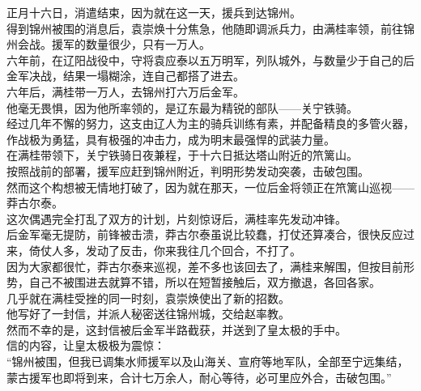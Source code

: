 \begin{multicols}{\theparacolNo}
正月十六日，消遣结束，因为就在这一天，援兵到达锦州。\\

得到锦州被围的消息后，袁崇焕十分焦急，他随即调派兵力，由满桂率领，前往锦州会战。援军的数量很少，只有一万人。\\

六年前，在辽阳战役中，守将袁应泰以五万明军，列队城外，与数量少于自己的后金军决战，结果一塌糊涂，连自己都搭了进去。\\

六年后，满桂带一万人，去锦州打六万后金军。\\

他毫无畏惧，因为他所率领的，是辽东最为精锐的部队——关宁铁骑。\\

经过几年不懈的努力，这支由辽人为主的骑兵训练有素，并配备精良的多管火器，作战极为勇猛，具有极强的冲击力，成为明末最强悍的武装力量。\\

在满桂带领下，关宁铁骑日夜兼程，于十六日抵达塔山附近的笊篱山。\\

按照战前的部署，援军应赶到锦州附近，判明形势发动突袭，击破包围。\\

然而这个构想被无情地打破了，因为就在那天，一位后金将领正在笊篱山巡视——莽古尔泰。\\

这次偶遇完全打乱了双方的计划，片刻惊讶后，满桂率先发动冲锋。\\

后金军毫无提防，前锋被击溃，莽古尔泰虽说比较蠢，打仗还算凑合，很快反应过来，倚仗人多，发动了反击，你来我往几个回合，不打了。\\

因为大家都很忙，莽古尔泰来巡视，差不多也该回去了，满桂来解围，但按目前形势，自己不被围进去就算不错，所以在短暂接触后，双方撤退，各回各家。\\

几乎就在满桂受挫的同一时刻，袁崇焕使出了新的招数。\\

他写好了一封信，并派人秘密送往锦州城，交给赵率教。\\

然而不幸的是，这封信被后金军半路截获，并送到了皇太极的手中。\\

信的内容，让皇太极极为震惊：\\

“锦州被围，但我已调集水师援军以及山海关、宣府等地军队，全部至宁远集结，蒙古援军也即将到来，合计七万余人，耐心等待，必可里应外合，击破包围。”\\


\end{multicols}
